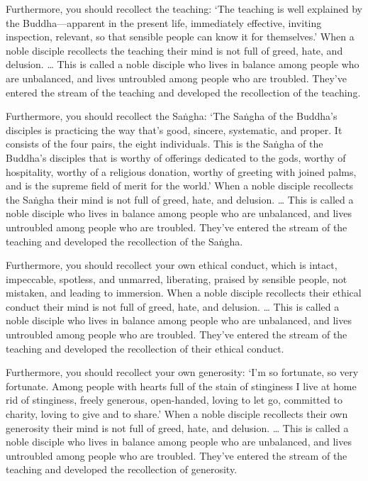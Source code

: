 \documentclass[12pt,openany]{book}%
\begin{document}
Furthermore, you should recollect the teaching: ‘The teaching is well explained by the Buddha—apparent in the present life, immediately effective, inviting inspection, relevant, so that sensible people can know it for themselves.’ When a noble disciple recollects the teaching their mind is not full of greed, hate, and delusion. … This is called a noble disciple who lives in balance among people who are unbalanced, and lives untroubled among people who are troubled. They’ve entered the stream of the teaching and developed the recollection of the teaching. 

Furthermore, you should recollect the \textsanskrit{Saṅgha}: ‘The \textsanskrit{Saṅgha} of the Buddha’s disciples is practicing the way that’s good, sincere, systematic, and proper. It consists of the four pairs, the eight individuals. This is the \textsanskrit{Saṅgha} of the Buddha’s disciples that is worthy of offerings dedicated to the gods, worthy of hospitality, worthy of a religious donation, worthy of greeting with joined palms, and is the supreme field of merit for the world.’ When a noble disciple recollects the \textsanskrit{Saṅgha} their mind is not full of greed, hate, and delusion. … This is called a noble disciple who lives in balance among people who are unbalanced, and lives untroubled among people who are troubled. They’ve entered the stream of the teaching and developed the recollection of the \textsanskrit{Saṅgha}. 

Furthermore, you should recollect your own ethical conduct, which is intact, impeccable, spotless, and unmarred, liberating, praised by sensible people, not mistaken, and leading to immersion. When a noble disciple recollects their ethical conduct their mind is not full of greed, hate, and delusion. … This is called a noble disciple who lives in balance among people who are unbalanced, and lives untroubled among people who are troubled. They’ve entered the stream of the teaching and developed the recollection of their ethical conduct. 

Furthermore, you should recollect your own generosity: ‘I’m so fortunate, so very fortunate. Among people with hearts full of the stain of stinginess I live at home rid of stinginess, freely generous, open-handed, loving to let go, committed to charity, loving to give and to share.’ When a noble disciple recollects their own generosity their mind is not full of greed, hate, and delusion. … This is called a noble disciple who lives in balance among people who are unbalanced, and lives untroubled among people who are troubled. They’ve entered the stream of the teaching and developed the recollection of generosity. 
\end{document}
